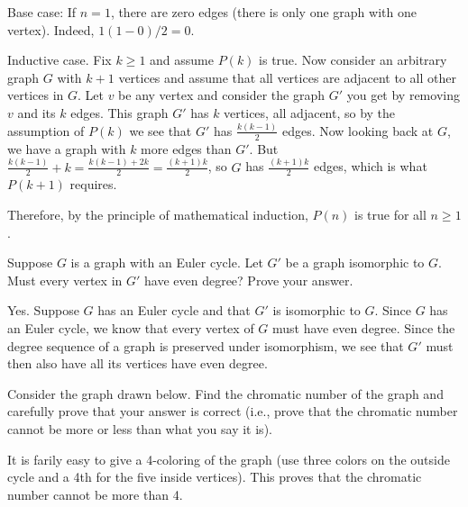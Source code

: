 \documentclass[12pt]{exam}
\begin{document}
\begin{questions}
\begin{parts}
\begin{solution}
		Base case: If $n = 1$, there are zero edges (there is only one graph with one vertex).  Indeed, $1(1-0)/2 = 0$.

		Inductive case.  Fix $k\ge 1$ and assume $P(k)$ is true.  Now consider an arbitrary graph $G$ with $k+1$ vertices and assume that all vertices are adjacent to all other vertices in $G$.  Let $v$ be any vertex and consider the graph $G'$ you get by removing $v$ and its $k$ edges.  This graph $G'$ has $k$ vertices, all adjacent, so by the assumption of $P(k)$ we see that $G'$ has $\frac{k(k-1)}{2}$ edges.  Now looking back at $G$, we have a graph with $k$ more edges than $G'$.
		But $\frac{k(k-1)}{2} + k = \frac{k(k-1)+2k}{2} = \frac{(k+1)k}{2}$, so $G$ has $\frac{(k+1)k}{2}$ edges, which is what $P(k+1)$ requires.

		Therefore, by the principle of mathematical induction, $P(n)$ is true for all $n \ge 1$.
	\end{solution}
\end{parts}

\question[10] Suppose $G$ is a graph with an Euler cycle.  Let $G'$ be a graph isomorphic to $G$.  Must every vertex in $G'$ have even degree?  Prove your answer.

\begin{solution}
	Yes.  Suppose $G$ has an Euler cycle and that $G'$ is isomorphic to $G$.  Since $G$ has an Euler cycle, we know that every vertex of $G$ must have even degree.  Since the degree sequence of a graph is preserved under isomorphism, we see that $G'$ must then also have all its vertices have even degree.
\end{solution}

\question[10] Consider the graph drawn below.  Find the chromatic number of the graph and carefully prove that your answer is correct (i.e., prove that the chromatic number cannot be more or less than what you say it is).

\begin{center}
\end{center}

\begin{solution}
	It is farily easy to give a 4-coloring of the graph (use three colors on the outside cycle and a 4th for the five inside vertices).  This proves that the chromatic number cannot be more than 4.


\end{solution}
\end{questions}
\end{document}
